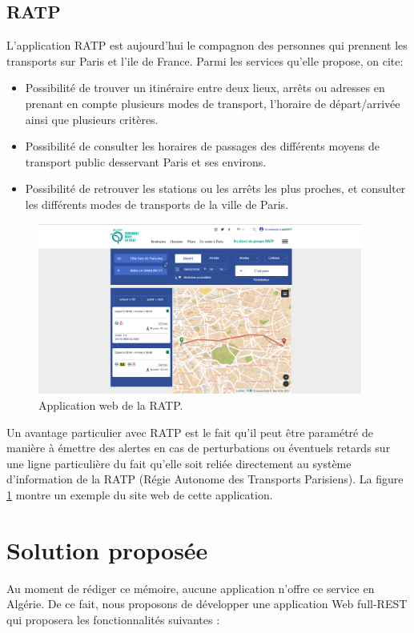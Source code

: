 \subsection{RATP}
L'application RATP est aujourd'hui le compagnon des personnes qui prennent les transports sur Paris et l'ile de France.
Parmi les services qu'elle propose, on cite:
\begin{itemize}
	\item Possibilité de trouver un itinéraire entre deux lieux, arrêts ou adresses en prenant en compte plusieurs modes de transport, l'horaire de départ/arrivée ainsi que plusieurs critères.
	\item Possibilité de consulter les horaires de passages des différents moyens de transport public desservant Paris et ses environs. 
	\item Possibilité de retrouver les stations ou les arrêts les plus proches, et consulter les différents modes de transports de la ville de Paris.
\end{itemize}

\begin{figure}[h!]
	\center
	\includegraphics[width=0.95\textwidth]{img/ratp.png}
	\caption{Application web de la RATP.}
	\label{fig:RATP}
\end{figure}
Un avantage particulier avec RATP est le fait qu'il peut être paramétré de manière à émettre des alertes en cas de perturbations ou éventuels retards sur une ligne particulière du fait qu'elle soit reliée directement au système d'information de la RATP (Régie Autonome des Transports Parisiens).
La figure \ref{fig:RATP} montre un exemple du site web de cette application.

\section{Solution proposée}
Au moment de rédiger ce mémoire, aucune application n'offre ce service en Algérie. \newline
De ce fait, nous proposons de développer une application Web full-REST qui proposera les fonctionnalités suivantes : 

